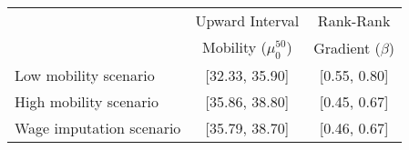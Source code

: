 \begin{tabular}{lcc}
\hline\hline
  &  Upward Interval          &  Rank-Rank \\
  & Mobility ($\mu_0^{50}$)  &  Gradient ($\beta$)        \\
Low mobility scenario &   [32.33, 35.90]          &  [0.55, 0.80]  \\
High mobility scenario &  [35.86, 38.80]      &  [0.45, 0.67]  \\
Wage imputation scenario &  [35.79, 38.70]     &  [0.46, 0.67]  \\

\hline
\end{tabular}

